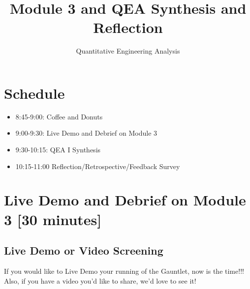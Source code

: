 \documentclass{tufte-handout}
\title{Module 3 and QEA Synthesis and Reflection}
\author{Quantitative Engineering Analysis}
\date{}
\begin{document}
\maketitle
\thispagestyle{firstpage}

\begin{abstract}
\end{abstract}

\section{Schedule}
\begin{itemize}
\item 8:45-9:00: Coffee and Donuts
\item 9:00-9:30: Live Demo and Debrief on Module 3
\item 9:30-10:15: QEA I Synthesis
\item 10:15-11:00 Reflection/Retrospective/Feedback Survey
\end{itemize}


\section{Live Demo and Debrief on Module 3 [30 minutes]}

\subsection{Live Demo or Video Screening}  
If you would like to Live Demo your running of the Gauntlet, now is the time!!!  Also, if you have a video you'd like to share, we'd love to see it!
\end{document}
